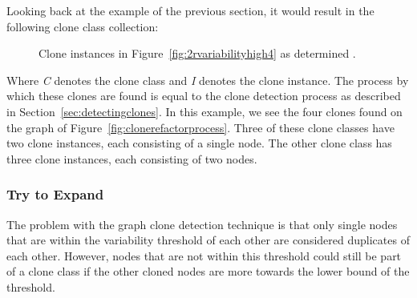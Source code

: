 Looking back at the example of the previous section, it would result in the following clone class collection:
\begin{figure}[H]
\begin{parcolumns}{3}
\end{parcolumns}
\caption{Clone instances in Figure~\ref{fig:2rvariabilityhigh4} as determined .}
\label{fig:2rvariabilityhigh5}
\end{figure}

Where \textit{C} denotes the clone class and \textit{I} denotes the clone instance. The process by which these clones are found is equal to the clone detection process as described in Section~\ref{sec:detectingclones}. In this example, we see the four clones found on the graph of Figure~\ref{fig:clonerefactorprocess}. Three of these clone classes have two clone instances, each consisting of a single node. The other clone class has three clone instances, each consisting of two nodes.

\subsubsection{Try to Expand}
The problem with the graph clone detection technique is that only single nodes that are within the variability threshold of each other are considered duplicates of each other. However, nodes that are not within this threshold could still be part of a clone class if the other cloned nodes are more towards the lower bound of the threshold.

